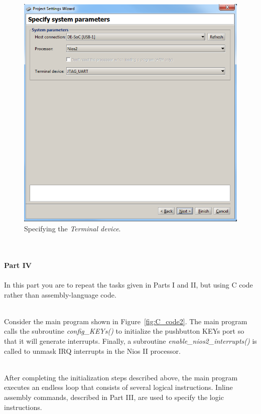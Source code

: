 \documentclass[epsfig,10pt,fullpage]{article}
\begin{document}
\newpage
\begin{figure}[htb]
	\begin{center}
	\includegraphics[scale=0.58]{figures/figureMP_terminal.png}
	\end{center}
	\vspace{-0.25cm}\caption{Specifying the {\it Terminal device}.}
\label{fig:MPterminal}
\end{figure}

~\\
~\\
\noindent
{\bf Part IV}
~\\
~\\
\noindent
In this part you are to repeat the tasks given in Parts I and II, but using C code rather
than assembly-language code.

~\\
\noindent
Consider the main program shown in Figure~\ref{fig:C_code2}. The main program calls the subroutine 
{\it config\_KEYs()} to initialize the pushbutton KEYs port so that it will generate interrupts. 
Finally, a subroutine {\it enable\_nios2\_interrupts()} is called to unmask IRQ interrupts in the Nios II processor.

~\\
\noindent
After completing the initialization steps
described above, the main program executes an endless loop that consists of several
logical instructions. Inline assembly commands, described in Part III, are used to specify 
the logic instructions.
\end{document}
